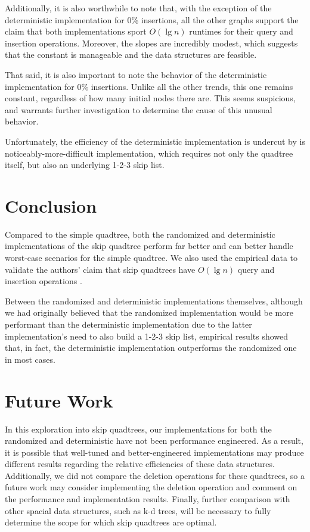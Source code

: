 \documentclass[12pt]{article}
\begin{document}
        Additionally, it is also worthwhile to note that, with the exception of the deterministic implementation for 0\% insertions, all the other graphs support the claim that both implementations sport $O(\lg n)$ runtimes for their query and insertion operations. Moreover, the slopes are incredibly modest, which suggests that the constant is manageable and the data structures are feasible.
        
        That said, it is also important to note the behavior of the deterministic implementation for 0\% insertions. Unlike all the other trends, this one remains constant, regardless of how many initial nodes there are. This seems suspicious, and warrants further investigation to determine the cause of this unusual behavior.
        
        Unfortunately, the efficiency of the deterministic implementation is undercut by is noticeably-more-difficult implementation, which requires not only the quadtree itself, but also an underlying 1-2-3 skip list.
    
    \section{Conclusion}
        Compared to the simple quadtree, both the randomized and deterministic implementations of the skip quadtree perform far better and can better handle worst-case scenarios for the simple quadtree. We also used the empirical data to validate the authors' claim that skip quadtrees have $O(\lg n)$ query and insertion operations \cite{sqt}.
        
        Between the randomized and deterministic implementations themselves, although we had originally believed that the randomized implementation would be more performant than the deterministic implementation due to the latter implementation's need to also build a 1-2-3 skip list, empirical results showed that, in fact, the deterministic implementation outperforms the randomized one in most cases.
        
    \section{Future Work}
        In this exploration into skip quadtrees, our implementations for both the randomized and deterministic have not been performance engineered. As a result, it is possible that well-tuned and better-engineered implementations may produce different results regarding the relative efficiencies of these data structures. Additionally, we did not compare the deletion operations for these quadtrees, so a future work may consider implementing the deletion operation and comment on the performance and implementation results. Finally, further comparison with other spacial data structures, such as k-d trees, will be necessary to fully determine the scope for which skip quadtrees are optimal.
    
\end{document}
